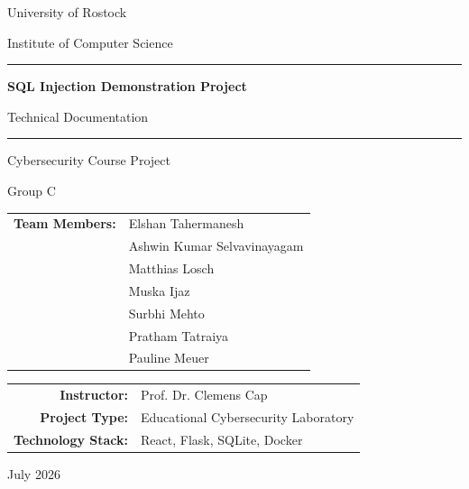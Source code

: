 \documentclass[12pt,a4paper]{article}
\begin{document}
\begin{titlepage}
    \thispagestyle{empty}
    \centering

    \vspace*{1.2cm}

    {\Large University of Rostock\par}
    \vspace{0.3cm}
    {\large Institute of Computer Science\par}

    \vspace{2.0cm}

    {\color{CyberBlue}\rule{0.85\textwidth}{1.5pt}\par}
    \vspace{0.55cm}
    {\Huge\bfseries SQL Injection Demonstration Project\par}
    \vspace{0.4cm}
    {\LARGE\color{CyberGray}Technical Documentation\par}
    \vspace{0.55cm}
    {\color{CyberBlue}\rule{0.85\textwidth}{1.5pt}\par}

    \vspace{1.7cm}

    {\Large Cybersecurity Course Project\par}
    \vspace{0.4cm}
    {\large Group C\par}

    \vspace{1.6cm}

    \begin{tabular}{>{\bfseries}r l}
        Team Members: & Elshan Tahermanesh \\
                      & Ashwin Kumar Selvavinayagam \\
                      & Matthias Losch \\
                      & Muska Ijaz \\
                      & Surbhi Mehto \\
                      & Pratham Tatraiya \\
                      & Pauline Meuer \\
    \end{tabular}

    \vspace{1.5cm}

    \begin{tabular}{>{\bfseries}r l}
        Instructor: & Prof. Dr. Clemens Cap \\
        Project Type: & Educational Cybersecurity Laboratory \\
        Technology Stack: & React, Flask, SQLite, Docker \\
    \end{tabular}

    \vfill

    {\large July 2026\par}
\end{titlepage}
\end{document}
